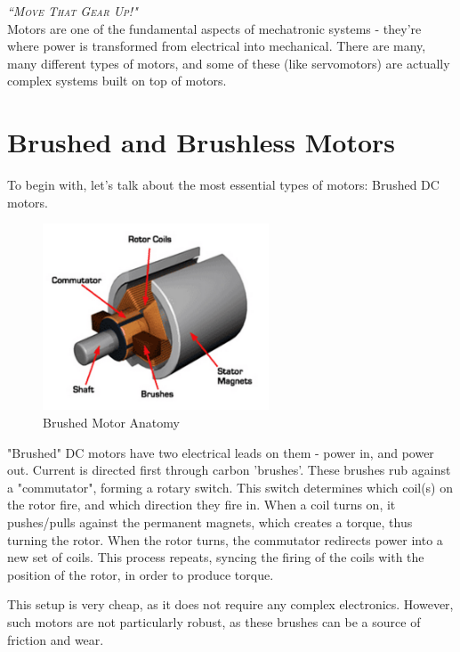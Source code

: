 \documentclass[10pt,letterpaper]{book}
\begin{document}
 {\slshape \scshape ``Move That Gear Up!"}
 \\
 
 Motors are one of the fundamental aspects of mechatronic systems - they're where power is transformed from electrical into mechanical. There are many, many different types of motors, and some of these (like servomotors) are actually complex systems built on top of motors.

\section{Brushed and Brushless Motors}

To begin with, let's talk about the most essential types of motors: Brushed DC motors.

\begin{figure}[H]\centering
\includegraphics[width=0.6\textwidth]{img_Mechatronics_Motors_brushed.png}
\caption{Brushed Motor Anatomy}
\end{figure}

"Brushed" DC motors have two electrical leads on them - power in, and power out. Current is directed first through carbon 'brushes'. These brushes rub against a "commutator", forming a rotary switch. This switch determines which coil(s) on the rotor fire, and which direction they fire in. When a coil turns on, it pushes/pulls against the permanent magnets, which creates a torque, thus turning the rotor. When the rotor turns, the commutator redirects power into a new set of coils. This process repeats, syncing the firing of the coils with the position of the rotor, in order to produce torque. 


This setup is very cheap, as it does not require any complex electronics. However, such motors are not particularly robust, as these brushes can be a source of friction and wear.
\end{document}
